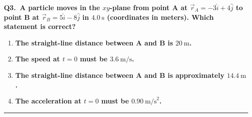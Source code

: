 \documentclass[11pt]{article}
\newcommand{\QuestionStyle}[1]{{\large\bfseries\boldmath #1}}
\newcommand{\AnswerStyle}[1]{{\large\bfseries\boldmath #1}}
\newcommand{\ReasonStyle}[1]{{\normalsize #1}}
\newif\ifshowreason
\newcommand{\Correct}[2]{%
  \item \AnswerStyle{\textcolor{AnsRed}{#1}}%
  \ifshowreason\\[-0.2em]
    \ReasonStyle{\textcolor{AnsRed}{#2}}%
  \fi
}
\newcommand{\Wrong}[2]{%
  \item \AnswerStyle{\textcolor{WrongBlue}{#1}}%
  \ifshowreason\\[-0.2em]
    \ReasonStyle{\textcolor{WrongBlue}{#2}}%
  \fi
}
\newcommand{\QBlock}[3]{%
  \Needspace{8\baselineskip}%
  \noindent
  \begin{minipage}{\linewidth}
    \QuestionStyle{#1.~#2}

    \vspace{0.25em}
    \begin{enumerate}
      #3
    \end{enumerate}

    \vspace{0.25em}
    \hrule height 0.4pt
  \end{minipage}
  \vspace{0.75em}
}
\begin{document}
\QBlock{Q3}{A particle moves in the $xy$-plane from point A at $\vec{r}_A=-3\hat{i}+4\hat{j}$ to point B at $\vec{r}_B=5\hat{i}-8\hat{j}$ in $4.0\ \text{s}$ (coordinates in meters). Which statement is correct?}{
  \Wrong{The straight-line distance between A and B is $20\ \text{m}$.}{This comes from adding component changes ($|\Delta x|+|\Delta y|=8+12$) instead of using $\sqrt{(\Delta x)^2+(\Delta y)^2}$.}
  \Wrong{The speed at $t=0$ must be $3.6\ \text{m/s}$.}{Computing $|\Delta \vec{r}|/\Delta t$ gives the magnitude of average velocity, not the instantaneous speed at $t=0$; many motions can share the same endpoints and time.}
  \Correct{The straight-line distance between A and B is approximately $14.4\ \text{m}$.}{Compute displacement: $\Delta\vec{r}=\vec{r}_B-\vec{r}_A=(5-(-3))\hat{i}+(-8-4)\hat{j}=8\hat{i}-12\hat{j}$. The straight-line separation is $|\Delta\vec{r}|=\sqrt{8^2+(-12)^2}=\sqrt{208}\approx 14.4\ \text{m}$.}
  \Wrong{The acceleration at $t=0$ must be $0.90\ \text{m/s}^2$.}{Acceleration at a particular time cannot be uniquely determined from only initial/final positions and elapsed time without extra information (e.g., full trajectory or a constant-acceleration constraint plus more data).}
}
\end{document}
